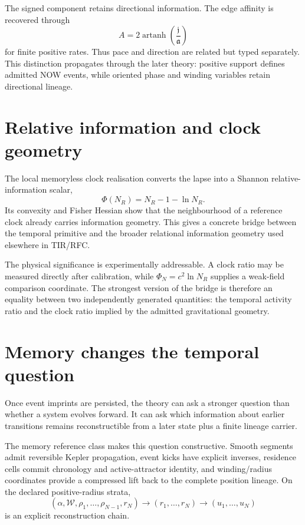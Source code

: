 The signed component retains directional information. The edge affinity is recovered through
\[
A=2\operatorname{artanh}\left(\frac{\mathfrak j}{\mathfrak a}\right)
\]
for finite positive rates. Thus pace and direction are related but typed separately. This distinction propagates through the later theory: positive support defines admitted NOW events, while oriented phase and winding variables retain directional lineage.

\section{Relative information and clock geometry}

The local memoryless clock realisation converts the lapse into a Shannon relative-information scalar,
\[
\Phi(N_R)=N_R-1-\ln N_R.
\]
Its convexity and Fisher Hessian show that the neighbourhood of a reference clock already carries information geometry. This gives a concrete bridge between the temporal primitive and the broader relational information geometry used elsewhere in TIR/RFC.

The physical significance is experimentally addressable. A clock ratio may be measured directly after calibration, while \(\Phi_N=c^2\ln N_R\) supplies a weak-field comparison coordinate. The strongest version of the bridge is therefore an equality between two independently generated quantities: the temporal activity ratio and the clock ratio implied by the admitted gravitational geometry.

\section{Memory changes the temporal question}

Once event imprints are persisted, the theory can ask a stronger question than whether a system evolves forward. It can ask which information about earlier transitions remains reconstructible from a later state plus a finite lineage carrier.

The memory reference class makes this question constructive. Smooth segments admit reversible Kepler propagation, event kicks have explicit inverses, residence cells commit chronology and active-attractor identity, and winding/radius coordinates provide a compressed lift back to the complete position lineage. On the declared positive-radius strata,
\[
(\alpha,\mathcal W,\rho_1,\ldots,\rho_{N-1},r_N)
\longrightarrow
(r_1,\ldots,r_N)
\longrightarrow
(u_1,\ldots,u_N)
\]
is an explicit reconstruction chain.

